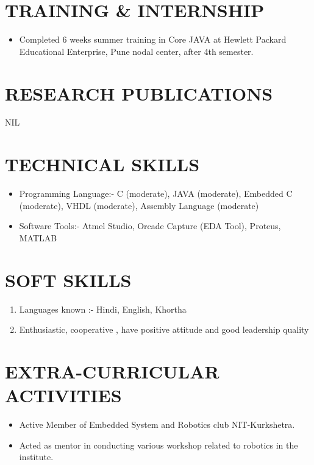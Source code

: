 \documentclass[11pt,a4paper,sans]{moderncv}
\begin{document}
\section{TRAINING \& INTERNSHIP}
\begin{itemize}
\item Completed 6 weeks summer training in Core JAVA at Hewlett Packard Educational Enterprise, Pune nodal center, after 4th semester.
\end{itemize}

\section{RESEARCH PUBLICATIONS}
NIL 
\newline \newline
\section{TECHNICAL SKILLS}
\begin{itemize}
\item Programming Language:- C (moderate), JAVA (moderate), Embedded C (moderate),  VHDL (moderate), Assembly Language (moderate)
\item Software Tools:- Atmel Studio,  Orcade Capture (EDA Tool), Proteus, MATLAB
\end{itemize}

\section{SOFT SKILLS}
\begin{enumerate}
\item Languages known :- Hindi, English, Khortha
\item Enthusiastic, cooperative , have positive attitude and good leadership quality
\end{enumerate}


\section{EXTRA-CURRICULAR ACTIVITIES}
\begin{itemize}
\item Active Member of Embedded System and Robotics club NIT-Kurkshetra.
\item Acted as mentor in conducting various workshop related to robotics in the institute. 
\end{itemize}
\end{document}
